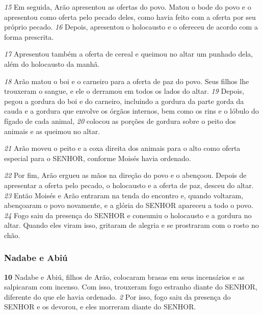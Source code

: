 \smallskip
\textit{\tiny 15}
Em seguida, Arão apresentou as ofertas do povo. Matou o bode do povo e o
apresentou como oferta pelo pecado deles, como havia feito com a oferta por seu
próprio pecado. 
\textit{\tiny 16}
Depois, apresentou o holocausto e o ofereceu de acordo com a
forma prescrita. 

\smallskip
\textit{\tiny 17}
Apresentou também a oferta de cereal e queimou no altar um
punhado dela, além do holocausto da manhã.

\smallskip 
\textit{\tiny 18}
Arão matou o boi e o carneiro para a oferta de paz do povo. Seus filhos lhe
trouxeram o sangue, e ele o derramou em todos os lados do altar. 
\textit{\tiny 19}
Depois, pegou
a gordura do boi e do carneiro, incluindo a gordura da parte gorda da cauda e a
gordura que envolve os órgãos internos, bem como os rins e o lóbulo do fígado de
cada animal, 
\textit{\tiny 20}
colocou as porções de gordura sobre o peito dos animais e as
queimou no altar. 

\smallskip 
\textit{\tiny 21}
Arão moveu o peito e a coxa direita dos animais para o alto
como oferta especial para o SENHOR, conforme Moisés havia ordenado.

\smallskip
\textit{\tiny 22}
Por fim, Arão ergueu as mãos na direção do povo e o abençoou. Depois de
apresentar a oferta pelo pecado, o holocausto e a oferta de paz, desceu do altar.
\textit{\tiny 23}
Então Moisés e Arão entraram na tenda do encontro e, quando voltaram,
abençoaram o povo novamente, e a glória do SENHOR apareceu a todo o povo.
\textit{\tiny 24}
Fogo saiu da presença do SENHOR e consumiu o holocausto e a gordura no altar.
Quando eles viram isso, gritaram de alegria e se prostraram com o rosto no chão.

\bigskip
\subsubsection*{Nadabe e Abiú}
\textbf{\large 10}
 Nadabe e Abiú, filhos de Arão, colocaram brasas em seus incensários e as
salpicaram com incenso. Com isso, trouxeram fogo estranho diante do SENHOR,
diferente do que ele havia ordenado. 
\textit{\tiny 2} 
Por isso, fogo saiu da presença do SENHOR e
os devorou, e eles morreram diante do SENHOR.

